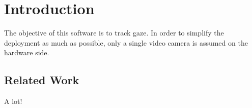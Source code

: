 \chapter*{Introduction}
The objective of this software is to track gaze.
In order to simplify the deployment as much as possible, only a single video camera is assumed on the hardware side.

\section*{Related Work}
A lot!
